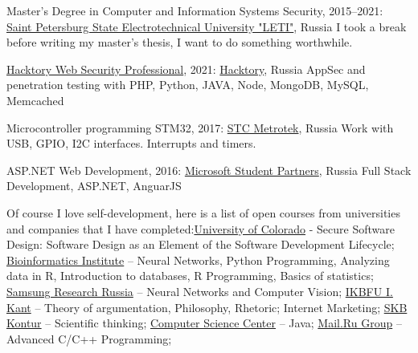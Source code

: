 \documentclass{yb}
\begin{document}
\begin{samepage}

Master's Degree in Computer and Information Systems Security, 2015--2021:\newline
\href{https://etu.ru/en/university/}{Saint Petersburg State Electrotechnical University "LETI"}, Russia\newline
I took a break before writing my master's thesis, I want to do something worthwhile.

\href{https://app.hacktory.ai/certificates/ca203296-188e-4df4-9308-4d4cb08e8b9f}{Hacktory Web Security Professional}, 2021:\newline
\href{https://hacktory.ai/}{Hacktory}, Russia\newline
AppSec and penetration testing with PHP, Python, JAVA, Node, MongoDB, MySQL, Memcached

Microcontroller programming STM32, 2017:\newline
\href{https://stc.metrotek.ru/}{STC Metrotek}, Russia\newline
Work with USB, GPIO, I2C interfaces. Interrupts and timers.

ASP.NET Web Development, 2016:\newline
\href{https://studentambassadors.microsoft.com/ru-ru}{Microsoft Student Partners}, Russia\newline
Full Stack Development, ASP.NET, AnguarJS\newline

Of course I love self-development, here is a list of open courses from universities and companies that I have completed:\newline \href{https://www.colorado.edu/}{University of Colorado} - Secure Software Design: Software Design as an Element of the Software Development Lifecycle; \href{https://bioinf.me/en}{Bioinformatics Institute} -- Neural Networks, Python Programming, Analyzing data in R, Introduction to databases, R Programming, Basics of statistics; \href{https://research.samsung.com/srr}{Samsung Research Russia} -- Neural Networks and Computer Vision; \href{https://eng.kantiana.ru/}{IKBFU I. Kant} -- Theory of argumentation, Philosophy, Rhetoric; Internet Marketing; \href{https://kontur.ru/}{SKB Kontur} -- Scientific thinking; \href{https://compscicenter.ru/}{Computer Science Center} -- Java; \href{https://en.wikipedia.org/wiki/VK_(company)}{Mail.Ru Group} -- Advanced C/C++ Programming;

\end{samepage}
\end{document}
